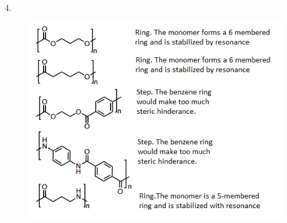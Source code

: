 \documentclass{article}
\begin{document}
4. \begin{figure}[h]
\centering
\includegraphics[scale=0.6]{P4.png}
\end{figure}
\end{document}
